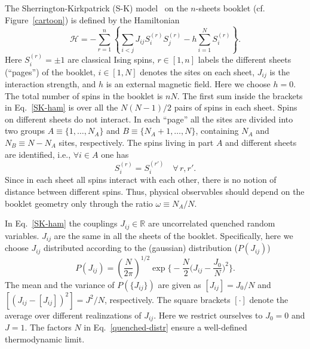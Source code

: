 \documentclass[twocolumn,superscriptaddress,prb,10pt]{revtex4-1}
\begin{document}
The Sherrington-Kirkpatrick (S-K) model~\cite{sherrington-1978-prl,
sherrington-1978} on the $n$-sheets booklet (cf. Figure~\ref{cartoon}) is 
defined by the Hamiltonian
%
\begin{equation}
{\mathcal H}=-\sum\limits_{r=1}^n\left\{\sum\limits_{i<j}J_{ij}S^{(r)}_i 
S^{(r)}_j-h\sum\limits_{i=1}^NS^{(r)}_i\right\}.
\label{SK-ham}
\end{equation}
%
Here $S_i^{(r)}=\pm 1$ are classical Ising spins, $r\in[1,n]$ labels the 
different sheets (``pages'') of the booklet, $i\in[1,N]$ denotes the sites on 
each sheet, $J_{ij}$ is the interaction strength, and $h$ is an external 
magnetic field. Here we choose $h=0$. The total number of spins in the booklet 
is $nN$. The first sum inside the brackets in Eq.~\eqref{SK-ham} is over all the 
$N(N-1)/2$ pairs of spins in each sheet. Spins on different sheets do not interact. 
In each ``page''  all the sites are divided into two groups $A\equiv\{1,\dots, 
N_A\}$ and $B\equiv\{N_A+1,\dots,N\}$, containing $N_A$ and $N_B\equiv N-N_A$ 
sites, respectively. The spins living in part $A$ and different sheets 
are identified, i.e., $\forall i\in A$ one has  
%
\begin{equation}
S_i^{(r)}=S_{i}^{(r')}\quad\forall\, r,r'. 
\label{book-constraint}
\end{equation}
%
Since in each sheet all spins interact with each other, there is no notion of distance 
between different spins. Thus, physical observables should depend on the booklet geometry 
only through the ratio $\omega\equiv N_A/N$. 

In Eq.~\eqref{SK-ham} the couplings $J_{ij}\in\mathbb{R}$ are uncorrelated quenched 
random variables. $J_{ij}$ are the same in all the sheets of the booklet. Specifically, 
here we choose $J_{ij}$ distributed according to the (gaussian) distribution ($P(J_{ij})$)  
%
\begin{equation}
P(J_{ij})=
\left(\frac{N}{2\pi}\right)^{1/2}
\exp\Big\{-\frac{N}{2}
\Big(J_{ij}-\frac{J_0}{N}\Big)^2\Big\}.
\label{quenched-distr}
\end{equation}
%
The mean and the variance of $P(\{J_{ij}\})$ are given as $[J_{ij}]=J_0/N$ 
and $[(J_{ij}-[J_{ij}])^2]=J^2/N$, respectively. The square brackets $[\cdot]$ denote 
the average over different realinzations of $J_{ij}$.  Here we restrict ourselves to 
$J_0=0$ and $J=1$. The factors $N$ in Eq.~\eqref{quenched-distr} ensure a well-defined 
thermodynamic limit. 
\end{document}
